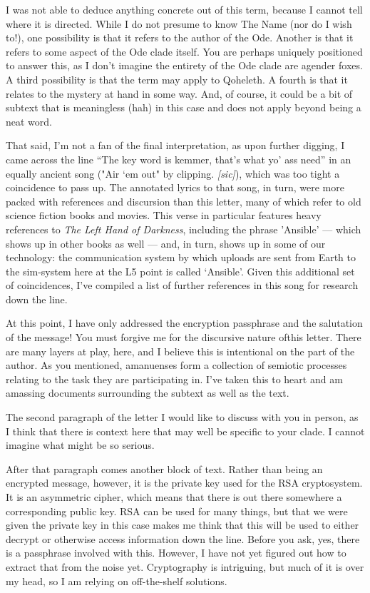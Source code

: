 I was not able to deduce anything concrete out of this term, because I cannot tell where it is directed. While I do not presume to know The Name (nor do I wish to!), one possibility is that it refers to the author of the Ode. Another is that it refers to some aspect of the Ode clade itself. You are perhaps uniquely positioned to answer this, as I don't imagine the entirety of the Ode clade are agender foxes. A third possibility is that the term may apply to Qoheleth. A fourth is that it relates to the mystery at hand in some way. And, of course, it could be a bit of subtext that is meaningless (hah) in this case and does not apply beyond being a neat word.

That said, I'm not a fan of the final interpretation, as upon further digging, I came across the line ``The key word is kemmer, that's what yo' ass need'' in an equally ancient song ("Air `em out" by clipping. \emph{{[}sic{]}}), which was too tight a coincidence to pass up. The annotated lyrics to that song, in turn, were more packed with references and discursion than this letter, many of which refer to old science fiction books and movies. This verse in particular features heavy references to \emph{The Left Hand of Darkness}, including the phrase 'Ansible' --- which shows up in other books as well --- and, in turn, shows up in some of our technology: the communication system by which uploads are sent from Earth to the sim-system here at the L5 point is called `Ansible'. Given this additional set of coincidences, I've compiled a list of further references in this song for research down the line.

At this point, I have only addressed the encryption passphrase and the salutation of the message! You must forgive me for the discursive nature ofthis letter. There are many layers at play, here, and I believe this is intentional on the part of the author. As you mentioned, amanuenses form a collection of semiotic processes relating to the task they are participating in. I've taken this to heart and am amassing documents surrounding the subtext as well as the text.

The second paragraph of the letter I would like to discuss with you in person, as I think that there is context here that may well be specific to your clade. I cannot imagine what might be so serious.

After that paragraph comes another block of text. Rather than being an encrypted message, however, it is the private key used for the RSA cryptosystem. It is an asymmetric cipher, which means that there is out there somewhere a corresponding public key. RSA can be used for many things, but that we were given the private key in this case makes me think that this will be used to either decrypt or otherwise access information down the line. Before you ask, yes, there is a passphrase involved with this. However, I have not yet figured out how to extract that from the noise yet. Cryptography is intriguing, but much of it is over my head, so I am relying on off-the-shelf solutions.

